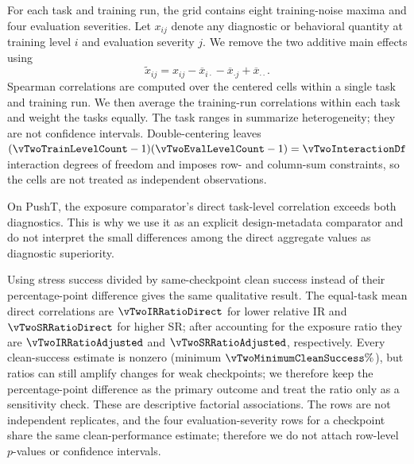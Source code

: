 For each task and training run, the grid contains eight training-noise maxima
and four evaluation severities. Let $x_{ij}$ denote any diagnostic or behavioral
quantity at training level $i$ and evaluation severity $j$. We remove the two
additive main effects using
\[
\widetilde{x}_{ij}
=x_{ij}-\overline{x}_{i\cdot}-\overline{x}_{\cdot j}
+\overline{x}_{\cdot\cdot}.
\]
Spearman correlations are computed over the \vTwoFactorialCellCount{} centered
cells within a single task and training run. We then average the
\vTwoRunCount{} training-run correlations within each task and weight the
\vTwoTaskCount{} tasks equally. The task ranges in
 summarize heterogeneity; they are not
confidence intervals. Double-centering leaves
$(\vTwoTrainLevelCount-1)(\vTwoEvalLevelCount-1)=\vTwoInteractionDf$
interaction degrees of freedom and imposes row- and column-sum constraints, so
the \vTwoFactorialCellCount{} cells are not treated as independent observations.


\FloatBarrier

On PushT, the exposure comparator's direct task-level correlation exceeds both
diagnostics. This is why we use it as an explicit design-metadata comparator
and do not interpret the small differences among the direct aggregate values as
diagnostic superiority.

Using stress success divided by same-checkpoint clean success instead of their
percentage-point difference gives the same qualitative result. The equal-task
mean direct correlations are $\vTwoIRRatioDirect$ for lower relative IR and
$\vTwoSRRatioDirect$ for higher SR; after accounting for the exposure ratio
they are $\vTwoIRRatioAdjusted$ and $\vTwoSRRatioAdjusted$, respectively.
Every clean-success estimate is nonzero (minimum
$\vTwoMinimumCleanSuccess\%$), but ratios can still amplify changes for weak
checkpoints; we therefore keep the percentage-point difference as the primary
outcome and treat the ratio only as a sensitivity check. These are descriptive
factorial associations. The \vTwoRowCount{} rows are not independent
replicates, and the four evaluation-severity rows for a checkpoint share the
same clean-performance estimate; therefore we do not attach row-level
$p$-values or confidence intervals.
